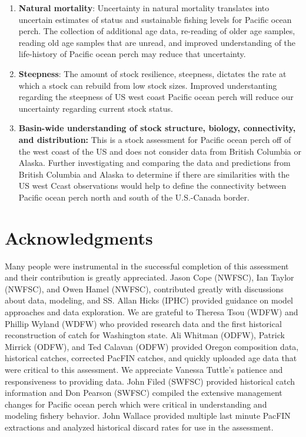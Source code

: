 \documentclass[12pt,]{article}
\begin{document}
\begin{enumerate}

\item \textbf{Natural mortality}: Uncertainty in natural mortality translates into uncertain estimates of status and sustainable fishing levels for Pacific ocean perch. The collection of additional age data, re-reading of older age samples, reading old age samples that are unread, and improved understanding of the life-history of Pacific ocean perch may reduce that uncertainty.

\item \textbf{Steepness}: The amount of stock resilience, steepness, dictates the rate at which a stock can rebuild from low stock sizes.  Improved understanting regarding the steepness of US west coast Pacific ocean perch will reduce our uncertainty regarding current stock status.

\item \textbf{Basin-wide understanding of stock structure, biology, connectivity, and distribution:} This is a stock assessment for Pacific ocean perch off of the west coast of the US and does not consider data from British Columbia or Alaska. Further investigating and comparing the data and predictions from British Columbia and Alaska to determine if there are similarities with the US west Ccast observations would help to define the connectivity between Pacific ocean perch north and south of the U.S.-Canada border.

\end{enumerate}

\section{Acknowledgments}\label{acknowledgments}

Many people were instrumental in the successful completion of this
assessment and their contribution is greatly appreciated. Jason Cope
(NWFSC), Ian Taylor (NWFSC), and Owen Hamel (NWFSC), contributed greatly
with discussions about data, modeling, and SS. Allan Hicks (IPHC)
provided guidance on model approaches and data exploration. We are
grateful to Theresa Tsou (WDFW) and Phillip Wyland (WDFW) who provided
research data and the first historical reconstruction of catch for
Washington state. Ali Whitman (ODFW), Patrick Mirrick (ODFW), and Ted
Calavan (ODFW) provided Oregon composition data, historical catches,
corrected PacFIN catches, and quickly uploaded age data that were
critical to this assessment. We appreciate Vanessa Tuttle's patience and
responsiveness to providing data. John Filed (SWFSC) provided historical
catch information and Don Pearson (SWFSC) compiled the extensive
management changes for Pacific ocean perch which were critical in
understanding and modeling fishery behavior. John Wallace provided
multiple last minute PacFIN extractions and analyzed historical discard
rates for use in the assessment.
\end{document}
